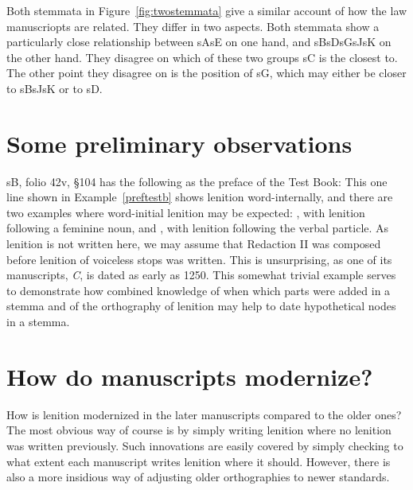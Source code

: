 Both stemmata in Figure~\ref{fig:twostemmata} give a similar account of how the law manuscriopts are related. They differ in two aspects. Both stemmata show a particularly close relationship between \gls{sA}\gls{sE} on one hand, and \gls{sB}\gls{sD}\gls{sG}\gls{sJ}\gls{sK} on the other hand. They disagree on which of these two groups \gls{sC} is the closest to. The other point they disagree on is the position of \gls{sG}, which may either be closer to \gls{sB}\gls{sJ}\gls{sK} or to \gls{sD}.
  
\section{Some preliminary observations}
\label{sec:some-prel-observ}

\gls{sB}, folio 42v, \S 104 has the following as the preface of the Test Book:
This one line shown in Example~\ref{preftestb} shows lenition word-internally, and there are two examples  where word-initial lenition may be expected: , with lenition following a feminine noun, and , with lenition following the verbal particle.
As lenition  is not written here, we may assume that Redaction II was composed before lenition of voiceless stops was written.
This is unsurprising, as one of its manuscripts, \textit{C}, is dated as early as 1250.
This somewhat trivial example serves to demonstrate how combined knowledge of when which parts were added in a stemma and of the orthography of lenition may help to date hypothetical nodes in a stemma. 


\section{How do manuscripts modernize?}
\label{sec:how-do-manuscripts}

How is lenition modernized in the later manuscripts compared to the older ones?
The most obvious way of course is by simply writing lenition where no lenition was written previously. Such innovations are easily covered by simply checking to what extent each manuscript writes lenition where it should. However, there is also a more insidious way of adjusting older orthographies to newer standards.


